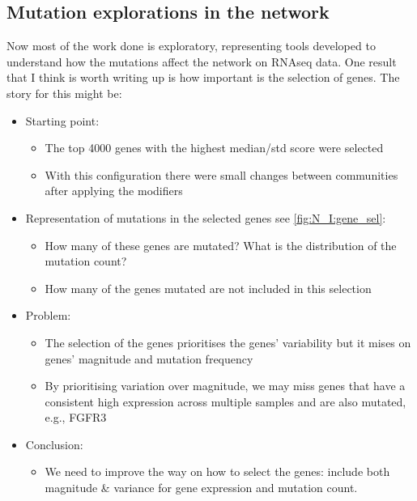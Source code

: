 \subsection{Mutation explorations in the network} \label{Sec:N_I:gene_sel}

Now most of the work done is exploratory, representing tools developed to understand how the mutations affect the network on RNAseq data. One result that I think is worth writing up is how important is the selection of genes. The story for this might be:
\begin{itemize}
    \item Starting point:
          \begin{itemize}
              \item The top 4000 genes with the highest median/std score were selected
              \item With this configuration there were small changes between communities after applying the modifiers
          \end{itemize}
    \item Representation of mutations in the selected genes see \ref*{fig:N_I:gene_sel}:
          \begin{itemize}
              \item How many of these genes are mutated? What is the distribution of the mutation count?
              \item How many of the genes mutated are not included in this selection
          \end{itemize}
    \item Problem:
          \begin{itemize}
              \item The selection of the genes prioritises the genes' variability but it mises on genes' magnitude and mutation frequency
              \item By prioritising variation over magnitude, we may miss genes that have a consistent high expression across multiple samples and are also mutated, e.g., FGFR3
          \end{itemize}
    \item Conclusion:
          \begin{itemize}
              \item We need to improve the way on how to select the genes: include both magnitude \& variance for gene expression and mutation count.
          \end{itemize}
\end{itemize}

